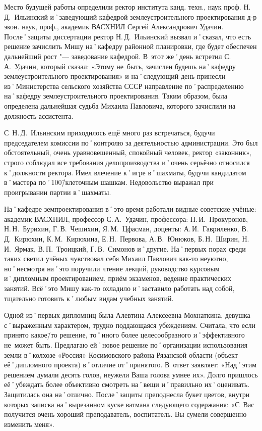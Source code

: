 Место будущей работы определили ректор института канд. техн., наук проф. Н.\,Д.~Ильинский и˚заведующий кафедрой землеустроительного проектирования д-р экон. наук, проф., академик ВАСХНИЛ Сергей Александрович Удачин. После˚защиты диссертации ректор Н.\,Д.~Ильинский вызвал и˚сказал, что есть решение зачислить Мишу на˚кафедру районной планировки, где будет обеспечен дальнейший рост "--- заведование кафедрой. В~этот же˚день встретил С.\,А.~Удачин, который сказал: «Этому не~быть, зачислен будешь на˚кафедру землеустроительного проектирования» и на˚следующий день принесли из˚Министерства сельского хозяйства СССР направление по˚распределению на˚кафедру землеустроительного проектирования. Таким образом, была определена дальнейшая судьба Михаила Павловича, которого зачислили на должность ассистента. 

С~Н.\,Д.~Ильинским приходилось ещё много раз встречаться, будучи председателем комиссии по˚контролю за  деятельностью администрации. Это был обстоятельный, очень уравновешенный, спокойный человек, ректор «законник», строго соблюдал все требования делопроизводства и˚очень серьёзно относился к˚должности ректора. Имел влечение к˚игре в˚шахматы, будучи кандидатом в˚мастера по˚100\=/клеточным шашкам. Недовольство выражал при проигрывании партии в˚шахматы.

На˚кафедре земпроектирования в˚это время работали видные советские учёные: академик ВАСХНИЛ, профессор С.\,А.~Удачин, профессора: Н.\,И.~Прокуронов, Н.\,Н.~Бурихин, Г.\,В.~Чешихин, Я.\,М.~Цфасман, доценты: А.\,И.~Гавриленко, В.\,Д.~Кирюхин, К.\,М.~Кирюхина, Е.\,Н.~Первова, А.\,В.~Юнюков, Б.\,Н.~Ширин, Н.\,И.~Ярмак, В.\,П.~Троицкий, Г.\,В.~Симонов и˚другие. На˚первых порах среди таких светил учёных чувствовал себя Михаил Павлович как-то неуютно, но˚несмотря на˚это поручили чтение лекций, руководство курсовым и˚дипломным проектированием, приём экзаменов, ведение практических занятий. Всё˚это Мишу как-то охладило и˚заставило работать над собой, тщательно готовить к˚любым видам учебных занятий.

Одной из˚первых дипломниц была Алевтина Алексеевна Мохнаткина, девушка с˚выраженным характером, трудно поддающаяся убеждениям. Считала, что если принято какое\=/то решение, то˚иного более целесообразного и˚эффективного не~может быть. Предлагаю ей˚новое решение по˚организации использования земли в˚колхозе «Россия» Косимовского района Рязанской области (объект её˚дипломного проекта) в˚отличие от˚принятого. В~ответ заявляет: «Над˚этим решением думали десять голов, неужели Ваша голова умнее их». Долго пришлось её˚убеждать более объективно смотреть на˚вещи и˚правильно их˚оценивать. Защитилась она на˚отлично. После˚защиты преподнесла букет цветов, внутри которых записка на˚вырезанном куске ватмана следующего содержания: «С~Вас получится очень хороший преподаватель, воспитатель. Вы сумели совершенно изменить меня».

